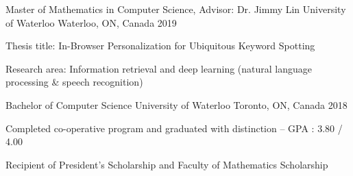 


\begin{cventries}



\cventry
{Master of Mathematics in Computer Science, Advisor: Dr. Jimmy Lin} %
{University of Waterloo} %
{Waterloo, ON, Canada} %
{2019} %
{ %
\begin{cvitems}
\item {Thesis title: In-Browser Personalization for Ubiquitous Keyword Spotting}
\item {Research area: Information retrieval and deep learning (natural language processing \& speech recognition)}
\end{cvitems}
}
\cventry
{Bachelor of Computer Science} %
{University of Waterloo} %
{Toronto, ON, Canada} %
{2018} %
{ %
\begin{cvitems}
\item {Completed co-operative program and graduated with distinction -- GPA : 3.80 / 4.00}
\item {Recipient of President’s Scholarship and Faculty of Mathematics Scholarship}
\end{cvitems}
}

\end{cventries}
\vspace*{-0.25cm}